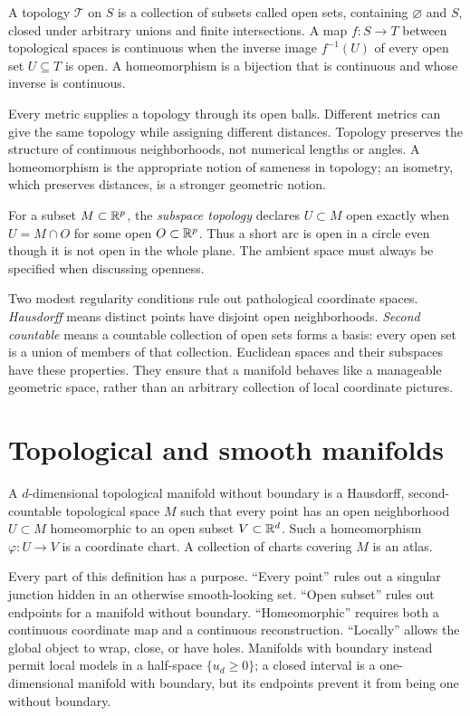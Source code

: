 \begin{definition}
A topology $\mathcal T$ on $S$ is a collection of subsets called open sets, containing $\varnothing$ and $S$, closed under arbitrary unions and finite intersections. A map $f:S\to T$ between topological spaces is continuous when the inverse image $f^{-1}(U)$ of every open set $U\subseteq T$ is open. A homeomorphism is a bijection that is continuous and whose inverse is continuous.
\end{definition}
Every metric supplies a topology through its open balls. Different metrics can give the same topology while assigning different distances. Topology preserves the structure of continuous neighborhoods, not numerical lengths or angles. A homeomorphism is the appropriate notion of sameness in topology; an isometry, which preserves distances, is a stronger geometric notion.

For a subset $M\subset\mathbb{R}^p$, the \emph{subspace topology} declares $U\subset M$ open exactly when $U=M\cap O$ for some open $O\subset\mathbb{R}^p$. Thus a short arc is open in a circle even though it is not open in the whole plane. The ambient space must always be specified when discussing openness.

Two modest regularity conditions rule out pathological coordinate spaces. \emph{Hausdorff} means distinct points have disjoint open neighborhoods. \emph{Second countable} means a countable collection of open sets forms a basis: every open set is a union of members of that collection. Euclidean spaces and their subspaces have these properties. They ensure that a manifold behaves like a manageable geometric space, rather than an arbitrary collection of local coordinate pictures.

\section{Topological and smooth manifolds}
\begin{definition}\label{def:manifold}
A $d$-dimensional topological manifold without boundary is a Hausdorff, second-countable topological space $M$ such that every point has an open neighborhood $U\subset M$ homeomorphic to an open subset $V\subset\mathbb{R}^d$. Such a homeomorphism $\varphi:U\to V$ is a coordinate chart. A collection of charts covering $M$ is an atlas.
\end{definition}
Every part of this definition has a purpose. ``Every point'' rules out a singular junction hidden in an otherwise smooth-looking set. ``Open subset'' rules out endpoints for a manifold without boundary. ``Homeomorphic'' requires both a continuous coordinate map and a continuous reconstruction. ``Locally'' allows the global object to wrap, close, or have holes. Manifolds with boundary instead permit local models in a half-space $\{u_d\geq0\}$; a closed interval is a one-dimensional manifold with boundary, but its endpoints prevent it from being one without boundary.

